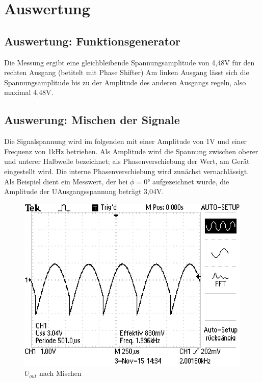 \section{Auswertung}
\label{sec:Auswertung}

\subsection{Auswertung: Funktionsgenerator}
Die Messung ergibt eine gleichbleibende Spannungsamplitude von 4,48V für den
rechten Ausgang (betitelt mit Phase Shifter)
Am linken Ausgang lässt sich die Spannungsamplitude bis zu der Amplitude des
anderen Ausgangs regeln, also maximal 4,48V.

\subsection{Auswerung: Mischen der Signale}

Die Signalspannung wird im folgenden mit einer Amplitude von 1V und einer
Frequenz von 1kHz betrieben. Als Amplitude wird die Spannung zwischen
oberer und unterer Halbwelle bezeichnet; als Phasenverschiebung der Wert, am
Gerät eingestellt wird. Die interne Phasenverschiebung wird zunächst
vernachlässigt. Als Beispiel dient ein Messwert, der bei $\phi = 0°$
aufgezeichnet wurde, die Amplitude der UAusgangsspannung beträgt 3,04V.
\begin{figure}
  \centering
  \includegraphics[angle=90,width=\textwidth]{graphics/ALL0031/F0031TEK.jpg}
  \caption{$U_{out}$ nach Mischen}
  \label{fig:2/phi0}
\end{figure}

